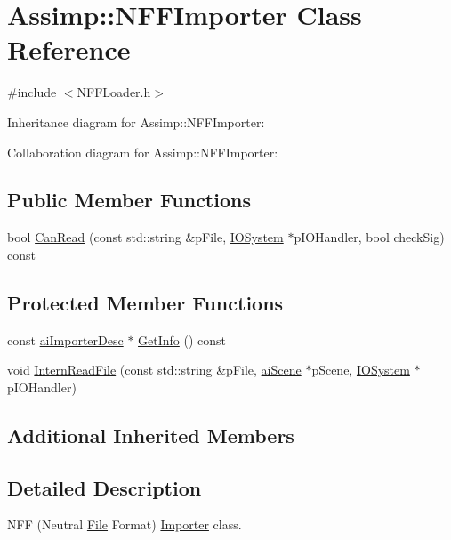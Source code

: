 \hypertarget{class_assimp_1_1_n_f_f_importer}{\section{Assimp\+:\+:N\+F\+F\+Importer Class Reference}
\label{class_assimp_1_1_n_f_f_importer}
}


{\ttfamily \#include $<$N\+F\+F\+Loader.\+h$>$}



Inheritance diagram for Assimp\+:\+:N\+F\+F\+Importer\+:


Collaboration diagram for Assimp\+:\+:N\+F\+F\+Importer\+:
\subsection*{Public Member Functions}
\begin{DoxyCompactItemize}
\item 
bool \hyperlink{class_assimp_1_1_n_f_f_importer_a219c8db688c14e57f02e69a37bc585da}{Can\+Read} (const std\+::string \&p\+File, \hyperlink{class_assimp_1_1_i_o_system}{I\+O\+System} $\ast$p\+I\+O\+Handler, bool check\+Sig) const 
\end{DoxyCompactItemize}
\subsection*{Protected Member Functions}
\begin{DoxyCompactItemize}
\item 
const \hyperlink{structai_importer_desc}{ai\+Importer\+Desc} $\ast$ \hyperlink{class_assimp_1_1_n_f_f_importer_ae47aa9ffe01aa6eb883ba8f0985f7737}{Get\+Info} () const 
\item 
void \hyperlink{class_assimp_1_1_n_f_f_importer_a97c20ab69758da48642dc690ab4a7b65}{Intern\+Read\+File} (const std\+::string \&p\+File, \hyperlink{structai_scene}{ai\+Scene} $\ast$p\+Scene, \hyperlink{class_assimp_1_1_i_o_system}{I\+O\+System} $\ast$p\+I\+O\+Handler)
\end{DoxyCompactItemize}
\subsection*{Additional Inherited Members}


\subsection{Detailed Description}
N\+F\+F (Neutral \hyperlink{class_file}{File} Format) \hyperlink{class_assimp_1_1_importer}{Importer} class.


